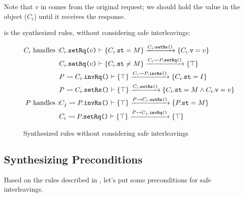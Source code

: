 \documentclass[format=manuscript]{acmart}
\begin{document}
\begin{center}
\end{center}

\begin{center}
\end{center}

Note that $v$ in  comes from the original request; we should
hold the value in the object ($C_i$) until it receives the response.

 is the synthesized rules, without
considering safe interleavings:

\begin{figure}[h]
  \begin{eqnarray*}
    C_i\ \textrm{handles}: &
    C_i.\texttt{setRq(}v\texttt{)}\vdash \{ C_i.\texttt{st} = M \} \xrightarrow{C_i:\texttt{setRs()}} \{ C_i.\texttt{v} = v \} \\
    & C_i.\texttt{setRq(}v\texttt{)}\vdash \{ C_i.\texttt{st} \neq M \} \xrightarrow{C_i \leadsto P.\texttt{setRq()}} \{ \top \} \\
    & P \leadsto C_i.\texttt{invRq()}\vdash \{ \top \} \xrightarrow{C_i \leadsto P.\texttt{invRs()}} \{ C_i.\texttt{st} = I \} \\
    & P \leadsto C_i.\texttt{setRs()}\vdash \{ \top \} \xrightarrow{C_i:\texttt{setRs()}} \{ C_i.\texttt{st} = M \wedge C_i.\texttt{v} = v \} \\
    P\ \textrm{handles}: &
    C_j \leadsto P.\texttt{invRs()}\vdash \{ \top \} \xrightarrow{P \leadsto C_i.\texttt{setRs()}} \{ P.\texttt{st} = M \} \\
    & C_i \leadsto P.\texttt{setRq()}\vdash \{ \top \} \xrightarrow{P \leadsto C_j.\texttt{invRq()}} \{ \top \} \\
  \end{eqnarray*}
  \caption{Synthesized rules without considering safe interleavings}
  \label{fig:synthesized-rules-naive}
\end{figure}

\subsection{Synthesizing Preconditions}

Based on the rules described in , let's put
some preconditions for safe interleavings.
\end{document}
